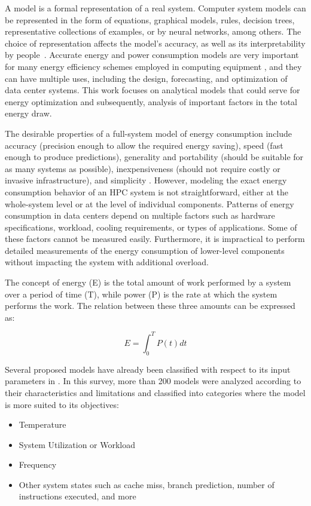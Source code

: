 \documentclass{ieeeaccess}
\begin{document}
A model is a formal representation of a real system. Computer system models can be represented in the form of equations, graphical models, rules, decision trees, representative collections of examples, or by neural networks, among others. The choice of representation affects the model's accuracy, as well as its interpretability by people~\cite{Hypothesis2012EncyclopediaLearning, Roy2019ForecastingNetwork, Zhu2019PredictingLearning}. Accurate energy and power consumption models are very important for many energy efficiency schemes employed in computing equipment \cite{Rivoire2007ModelsOptimizations}, and they can have multiple uses, including the design, forecasting, and optimization of data center systems. This work focuses on analytical models that could serve for energy optimization and subsequently, analysis of important factors in the total energy draw.

The desirable properties of a full-system model of energy consumption include accuracy (precision enough to allow the required energy saving), speed (fast enough to produce predictions), generality and portability (should be suitable for as many systems as possible), inexpensiveness (should not require costly or invasive infrastructure), and simplicity \cite{Rivoire2008AModels}. However, modeling the exact energy consumption behavior of an HPC system is not straightforward, either at the whole-system level or at the level of individual components. Patterns of energy consumption in data centers depend on multiple factors such as hardware specifications, workload, cooling requirements, or types of applications. Some of these factors cannot be measured easily. Furthermore, it is impractical to perform detailed measurements of the energy consumption of lower-level components without impacting the system with additional overload.

The concept of energy (E) is the total amount of work performed by a system over a period of time (T), while power (P) is the rate at which the system performs the work. The relation between these three amounts can be expressed as:

\begin{equation}
    E = \int_{0}^{T}P(t)dt
    \label{qe:energy_definition_cont}
\end{equation}

Several proposed models have already been classified with respect to its input parameters in \cite{Dayarathna2016DataSurvey}. In this survey, more than 200 models were analyzed according to their characteristics and limitations and classified into categories where the model is more suited to its objectives:
\begin{itemize}
    \item Temperature
    \item System Utilization or Workload
    \item Frequency
    \item Other system states such as cache miss, branch prediction, number of instructions executed, and more
    \label{tab:input_type}
\end{itemize}
\end{document}

